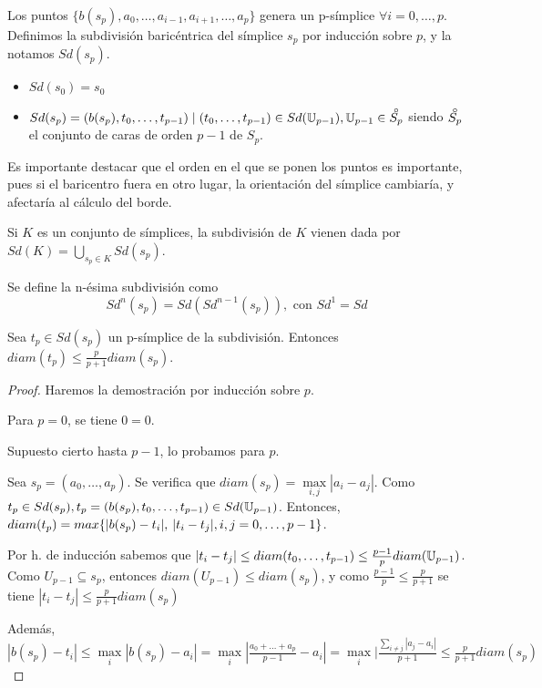 Los puntos $\{b(s_p), a_0, \dots, a_{i-1}, a_{i+1}, \dots, a_p\}$ genera un p-símplice $\forall i = 0, \dots, p$.
Definimos la subdivisión baricéntrica del símplice $s_p$ por inducción sobre $p$, y la notamos $Sd(s_p)$.
\begin{itemize}
  \item $Sd(s_0) = s_0$
  \item $Sd(s_p) = (b(s_p), t_0, \dots, t_{p-1}) \mid (t_0, \dots, t_{p-1}) \in Sd(\U_{p-1}), \U_{p-1} \in \interior{S_p}$
        siendo $\interior{S_p}$ el conjunto de caras de orden $p-1$ de $S_p$.
\end{itemize}

\begin{remark}
  Es importante destacar que el orden en el que se ponen los puntos es importante, pues si el baricentro fuera en otro lugar,
  la orientación del símplice cambiaría, y afectaría al cálculo del borde.
\end{remark}

Si $K$ es un conjunto de símplices, la subdivisión de $K$ vienen dada por $Sd(K) = \bigcup\limits_{s_p \in K} Sd(s_p)$.

Se define la n-ésima subdivisión como \[Sd^n(s_p) = Sd(Sd^{n-1}(s_p)), \text{ con } Sd^1 = Sd \]

\begin{proposition}
  Sea $t_p \in Sd(s_p)$ un p-símplice de la subdivisión. Entonces $diam(t_p) \leq \frac{p}{p+1} diam(s_p)$.
\end{proposition}

\begin{proof}
  Haremos la demostración por inducción sobre $p$.

  Para $p = 0$, se tiene $0 = 0$.

  Supuesto cierto hasta $p-1$, lo probamos para $p$.

  Sea $s_p = (a_0, \dots, a_p)$. Se verifica que $diam(s_p) = \max\limits_{i,j} |a_i - a_j|$.
  Como $t_p \in Sd(s_p), t_p = (b(s_p), t_0, \dots, t_{p-1}) \in Sd({\mathbb U}_{p-1})$.
  Entonces, $diam(t_p) = max\{|b(s_p) - t_i|,\hspace{0.2em} |t_i - t_j|, i,j = 0, \dots, p-1\}$.

  Por h. de inducción sabemos que $|t_i - t_j| \leq diam(t_0, \dots, t_{p-1}) \leq \frac{p-1}{p} diam({\mathbb U}_{p-1})$.
  Como $U_{p-1} \subseteq s_p$, entonces $diam(U_{p-1}) \leq diam(s_p)$, y como $\frac{p-1}{p} \leq \frac{p}{p+1}$
  se tiene $|t_i - t_j| \leq \frac{p}{p+1} diam(s_p)$

  Además, $|b(s_p) - t_i| \leq \max\limits_i |b(s_p) - a_i| = \max\limits_i |\frac{a_0 + \dots + a_p}{p-1} - a_i| =
  \max\limits_i | \frac{\sum\limits_{i \neq j} |a_j - a_i|}{p+1} \leq \frac{p}{p+1} diam(s_p)$
\end{proof}

